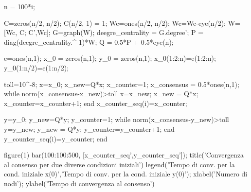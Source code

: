 n = 100*i;

C=zeros(n/2, n/2);
    C(n/2, 1) = 1;
    Wc=ones(n/2, n/2);
    Wc=Wc-eye(n/2);
    W=[Wc, C;
       C',Wc];
    G=graph(W);
    deegre_centrality = G.degree';
    P = diag(deegre_centrality.^-1)*W;
    Q = 0.5*P + 0.5*eye(n);

    e=ones(n,1);
    x_0 = zeros(n,1);
    y_0 = zeros(n,1);
    x_0(1:2:n)=e(1:2:n); %
    y_0(1:n/2)=e(1:n/2); %



    toll=10^-8;
   x=x_0;
   x_new=Q*x;
   x_counter=1;
   x_consensus = 0.5*ones(n,1);
   while norm(x_consensus-x_new)>toll
       x=x_new;
       x_new = Q*x;
       x_counter=x_counter+1;
   end
   x_counter_seq(i)=x_counter;

   y=y_0;
   y_new=Q*y;
   y_counter=1;
   while norm(x_consensus-y_new)>toll
       y=y_new;
       y_new = Q*y;
       y_counter=y_counter+1;
   end
   y_counter_seq(i)=y_counter;
end

figure(1)
bar(100:100:500, [x_counter_seq',y_counter_seq']);
title('Convergenza al consenso per due diverse condizioni iniziali')
legend('Tempo di conv. per la cond. iniziale x(0)','Tempo di conv. per la cond. iniziale y(0)');
xlabel('Numero di nodi');
ylabel('Tempo di convergenza al consenso')
    
